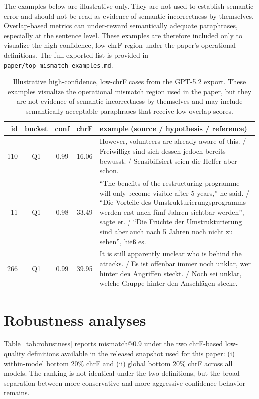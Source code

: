 \documentclass[10pt,conference]{IEEEtran}
\begin{document}
The examples below are illustrative only. They are not used to establish semantic error and should not be read as evidence of semantic incorrectness by themselves. Overlap-based metrics can under-reward semantically adequate paraphrases, especially at the sentence level. These examples are therefore included only to visualize the high-confidence, low-chrF region under the paper's operational definitions. The full exported list is provided in \texttt{paper/top\_mismatch\_examples.md}.

\begin{table}[t]
\centering
\scriptsize
\setlength{\tabcolsep}{4pt}
\begin{tabular}{rcccp{}}
\toprule
id & bucket & conf & chrF & example (source / hypothesis / reference) \\
\midrule
110 & Q1 & 0.99 & 16.06 & However, volunteers are already aware of this. / Freiwillige sind sich dessen jedoch bereits bewusst. / Sensibilisiert seien die Helfer aber schon. \\
11 & Q1 & 0.98 & 33.49 & ``The benefits of the restructuring programme will only become visible after 5 years,'' he said. / ``Die Vorteile des Umstrukturierungsprogramms werden erst nach fünf Jahren sichtbar werden'', sagte er. / ``Die Früchte der Umstrukturierung sind aber auch nach 5 Jahren noch nicht zu sehen'', hieß es. \\
266 & Q1 & 0.99 & 39.95 & It is still apparently unclear who is behind the attacks. / Es ist offenbar immer noch unklar, wer hinter den Angriffen steckt. / Noch sei unklar, welche Gruppe hinter den Anschlägen stecke. \\
\bottomrule
\end{tabular}
\caption{Illustrative high-confidence, low-chrF cases from the GPT-5.2 export. These examples visualize the operational mismatch region used in the paper, but they are not evidence of semantic incorrectness by themselves and may include semantically acceptable paraphrases that receive low overlap scores.}
\end{table}

\section{Robustness analyses}
\label{app:robustness}

Table~\ref{tab:robustness} reports mismatch@0.9 under the two chrF-based low-quality definitions available in the released snapshot used for this paper: (i) within-model bottom 20\% chrF and (ii) global bottom 20\% chrF across all models. The ranking is not identical under the two definitions, but the broad separation between more conservative and more aggressive confidence behavior remains.
\end{document}
